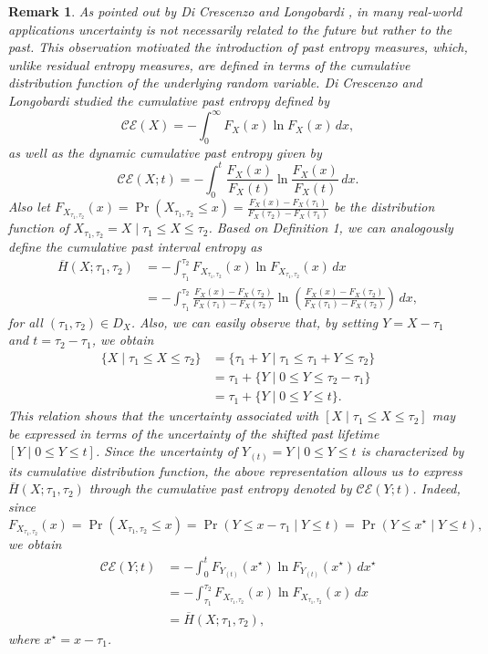 \documentclass[11pt]{article}
\newtheorem{remark}{Remark}
\begin{document}
\begin{remark}
	As pointed out by Di Crescenzo and Longobardi \cite{DiCrescenzo2009}, in many real-world applications uncertainty is not necessarily related to the future but rather to the past. This observation motivated the introduction of past entropy measures, which, unlike residual entropy measures, are defined in terms of the cumulative distribution function of the underlying random variable.
	Di Crescenzo and Longobardi \cite{DiCrescenzo2009} studied the \textit{cumulative past entropy} defined by 
	\[\textstyle
	\mathscr{CE}(X) =  - \int_{0}^{\infty} F_X(x) \ln F_X(x) \, dx,
	\]
	as well as the \textit{dynamic cumulative past entropy} given by
	\[ \textstyle
	\mathscr{CE}(X;t) =  - \int_{0}^{t} \frac{F_X(x)}{F_X(t)} \ln \frac{F_X(x)}{F_X(t)} \, dx.
	\]
	Also let \( \textstyle F_{X_{\tau_1,\tau_2}}(x) = \Pr(X_{\tau_1,\tau_2} \le x)	= \frac{F_X(x) - F_X(\tau_1)}{F_X(\tau_2) - F_X(\tau_1)} \)
	be the distribution function of $ X_{\tau_1,\tau_2} = X \mid \tau_1 \le X \le \tau_2$. Based on Definition 1, we can analogously define the \textit{cumulative past interval entropy} as
	\begin{align*}
		\overline{H}(X; \tau_1, \tau_2)
		& = \textstyle -\int_{\tau_1}^{\tau_2} F_{X_{\tau_1,\tau_2}}(x) \ln F_{X_{\tau_1,\tau_2}}(x) \, dx \nonumber \\
		& = \textstyle-\int_{\tau_1}^{\tau_2} \frac{F_X(x) - F_X(\tau_2)}{F_X(\tau_1) - F_X(\tau_2)} \ln \left( \frac{F_X(x) - F_X(\tau_2)}{F_X(\tau_1) - F_X(\tau_2)} \right) \, dx,
	\end{align*}
	for all $(\tau_1,\tau_2) \in D_X$.
	Also, we can easily observe that, by setting $Y = X - \tau_1$ and $t = \tau_2 - \tau_1$, we obtain
	\begin{align*} 
		\{ X \mid \tau_1 \le X \le \tau_2 \}
		&= \{ \tau_1 + Y \mid \tau_1 \le \tau_1 + Y \le \tau_2 \} \\
		&= \tau_1 + \{ Y \mid 0 \le Y \le \tau_2 - \tau_1 \} \\
		&= \tau_1 + \{ Y \mid 0 \le Y \le t \}.
	\end{align*}
	This relation shows that the uncertainty associated with $[X \mid \tau_1 \le X \le \tau_2]$ may be expressed in terms of the uncertainty of the shifted past lifetime $[Y \mid 0 \le Y \le t]$. Since the uncertainty of $Y_{(t)} = Y \mid 0 \le Y \le t$ is characterized by its cumulative distribution function, the above representation allows us to express $\overline{H}(X; \tau_1, \tau_2) $ through the cumulative past entropy denoted by $ \mathscr{CE}(Y; t) $. Indeed, since
	\[ \textstyle
	F_{X_{\tau_1,\tau_2}}(x)
	= \Pr(X_{\tau_1,\tau_2} \le x)
	= \Pr(Y \le x - \tau_1 \mid Y \le t)
	= \Pr(Y \le x^{\star} \mid Y \le t),
	\]
	we obtain
	\begin{align*}
		\mathscr{CE}(Y; t)
		&= \textstyle - \int_{0}^{t}
		F_{Y_{(t)}}(x^{\star}) \ln F_{Y_{(t)}}(x^{\star}) \, dx^{\star} \\
		&= \textstyle - \int_{\tau_1}^{\tau_2} F_{X_{\tau_1,\tau_2}}(x) \ln F_{X_{\tau_1,\tau_2}}(x) \, dx \\
		&= \overline{H}(X; \tau_1, \tau_2),
	\end{align*}
	where $x^{\star} = x - \tau_1$.
	

\end{remark}
\end{document}
